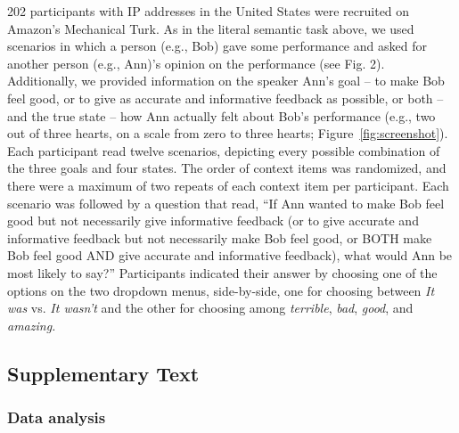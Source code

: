 \documentclass[12pt]{article}
\begin{document}
202 participants with IP addresses in the United States were recruited
on Amazon's Mechanical Turk. As in the literal semantic task above, we
used scenarios in which a person (e.g., Bob) gave some performance and
asked for another person (e.g., Ann)'s opinion on the performance (see
Fig. 2). Additionally, we provided information on the speaker Ann's goal
-- to make Bob feel good, or to give as accurate and informative
feedback as possible, or both -- and the true state -- how Ann actually
felt about Bob's performance (e.g., two out of three hearts, on a scale
from zero to three hearts; Figure~\ref{fig:screenshot}). Each
participant read twelve scenarios, depicting every possible combination
of the three goals and four states. The order of context items was
randomized, and there were a maximum of two repeats of each context item
per participant. Each scenario was followed by a question that read,
\enquote{If Ann wanted to make Bob feel good but not necessarily give
informative feedback (or to give accurate and informative feedback but
not necessarily make Bob feel good, or BOTH make Bob feel good AND give
accurate and informative feedback), what would Ann be most likely to
say?} Participants indicated their answer by choosing one of the options
on the two dropdown menus, side-by-side, one for choosing between
\emph{It was} vs. \emph{It wasn't} and the other for choosing among
\emph{terrible}, \emph{bad}, \emph{good}, and \emph{amazing.}

\subsection*{Supplementary Text}\label{supplementary-text}

\subsubsection*{Data analysis}\label{data-analysis}
\end{document}
